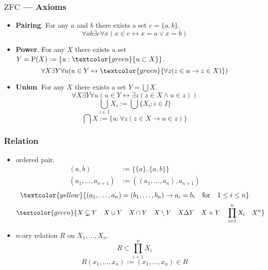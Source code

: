\documentclass[UTF8,aspectratio=43,11pt,colorlinks,compress,openany]{beamer}%
\begin{document}
\begin{frame}\frametitle{$\mathrm{ZFC}$ --- Axioms}
	\begin{itemize}
		\item \textbf{Pairing}. For any $a$ and $b$ there exists a set $c=\{a,b\}$.
		\[\forall ab\exists c\forall x(x\in c\leftrightarrow x=a\vee x=b)\]
		\item \textbf{Power}. For any $X$ there exists a set $Y=\operatorname{P}(X):=\{u: \textcolor{green}{u\subset X}\}$.
		\[\forall X\exists Y\forall u(u\in Y\leftrightarrow\textcolor{green}{\forall z(z\in u\to z\in X)})\]
		\item \textbf{Union}. For any $X$ there exists a set $Y=\bigcup X$.
		\[\forall X\exists Y\forall u(u\in Y\leftrightarrow\exists z(z\in X\wedge u\in z))\]
		\[\bigcup\limits_{i\in I}X_i:=\bigcup\{X_i: i\in I\}\]
		\[\bigcap X:=\{u: \forall z(z\in X\to u\in z)\}\]
	\end{itemize}
\end{frame}

\begin{frame}\frametitle{Relation}
	\begin{itemize}
		\item ordered pair.
		\begin{align*}
		(a,b)&:=\{\{a\},\{a,b\}\}\\
		(a_1,\dots,a_{n+1})&:=((a_1,\dots,a_n),a_{n+1})
		\end{align*}
		\[\textcolor{yellow}{(a_1,\dots,a_n)=(b_1,\dots,b_n)\to a_i=b_i\quad\text{for}\quad 1\leq i\leq n}\]
		\[\textcolor{green}{X\subsetneq Y\quad X\cup Y\quad X\cap Y\quad X\setminus Y\quad X\Delta Y\quad X\times Y\quad\prod\limits_{i=1}^n X_i\quad X^n}\]
		\item $n$-ary relation $R$ on $X_1,\dots,X_n$. \[R\subset\prod\limits_{i=1}^n X_i\]
		\[R(x_1,\dots,x_n):=(x_1,\dots,x_n)\in R\]
	\end{itemize}
\end{frame}
\end{document}
